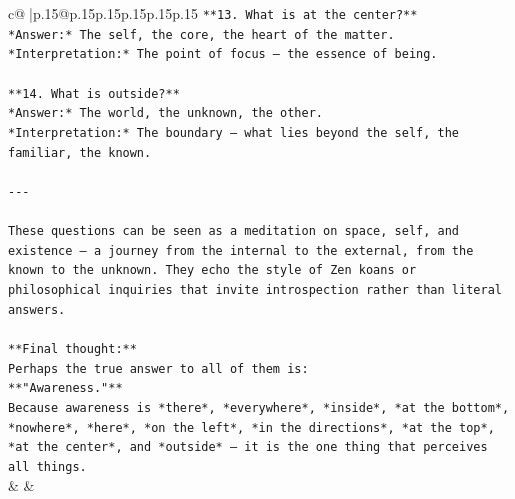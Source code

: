 \documentclass{article}
\begin{document}
{\begin{supertabular}{c@{$\;$}|p{.15\linewidth}@{}p{.15\linewidth}p{.15\linewidth}p{.15\linewidth}p{.15\linewidth}p{.15\linewidth}}
{{{\texttt{**13. What is at the center?**  } \\
\texttt{*Answer:* The self, the core, the heart of the matter.  } \\
\texttt{*Interpretation:* The point of focus — the essence of being.} \\
\\ 
\texttt{**14. What is outside?**  } \\
\texttt{*Answer:* The world, the unknown, the other.  } \\
\texttt{*Interpretation:* The boundary — what lies beyond the self, the familiar, the known.} \\
\\ 
\texttt{{-}{-}{-}} \\
\\ 
\texttt{These questions can be seen as a meditation on space, self, and existence — a journey from the internal to the external, from the known to the unknown. They echo the style of Zen koans or philosophical inquiries that invite introspection rather than literal answers.} \\
\\ 
\texttt{**Final thought:**  } \\
\texttt{Perhaps the true answer to all of them is:  } \\
\texttt{**"Awareness."**  } \\
\texttt{Because awareness is *there*, *everywhere*, *inside*, *at the bottom*, *nowhere*, *here*, *on the left*, *in the directions*, *at the top*, *at the center*, and *outside* — it is the one thing that perceives all things.} \\
            }
        }
    }
    & & \\ \\


\end{supertabular}}
\end{document}
